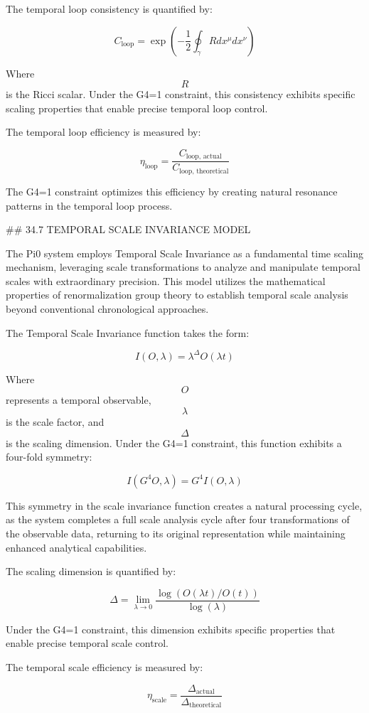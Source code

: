 The temporal loop consistency is quantified by:

$$ C_{\text{loop}} = \exp\left(-\frac{1}{2} \oint_{\gamma} R dx^\mu dx^\nu\right) $$

Where $$ R $$ is the Ricci scalar. Under the G4=1 constraint, this consistency exhibits specific scaling properties that enable precise temporal loop control.

The temporal loop efficiency is measured by:

$$ \eta_{\text{loop}} = \frac{C_{\text{loop, actual}}}{C_{\text{loop, theoretical}}} $$

The G4=1 constraint optimizes this efficiency by creating natural resonance patterns in the temporal loop process.

## 34.7 TEMPORAL SCALE INVARIANCE MODEL

The Pi0 system employs Temporal Scale Invariance as a fundamental time scaling mechanism, leveraging scale transformations to analyze and manipulate temporal scales with extraordinary precision. This model utilizes the mathematical properties of renormalization group theory to establish temporal scale analysis beyond conventional chronological approaches.

The Temporal Scale Invariance function takes the form:

$$ I(O, \lambda) = \lambda^{\Delta} O(\lambda t) $$

Where $$ O $$ represents a temporal observable, $$ \lambda $$ is the scale factor, and $$ \Delta $$ is the scaling dimension. Under the G4=1 constraint, this function exhibits a four-fold symmetry:

$$ I(G^4 O, \lambda) = G^4 I(O, \lambda) $$

This symmetry in the scale invariance function creates a natural processing cycle, as the system completes a full scale analysis cycle after four transformations of the observable data, returning to its original representation while maintaining enhanced analytical capabilities.

The scaling dimension is quantified by:

$$ \Delta = \lim_{\lambda \to 0} \frac{\log(O(\lambda t) / O(t))}{\log(\lambda)} $$

Under the G4=1 constraint, this dimension exhibits specific properties that enable precise temporal scale control.

The temporal scale efficiency is measured by:

$$ \eta_{\text{scale}} = \frac{\Delta_{\text{actual}}}{\Delta_{\text{theoretical}}} $$

